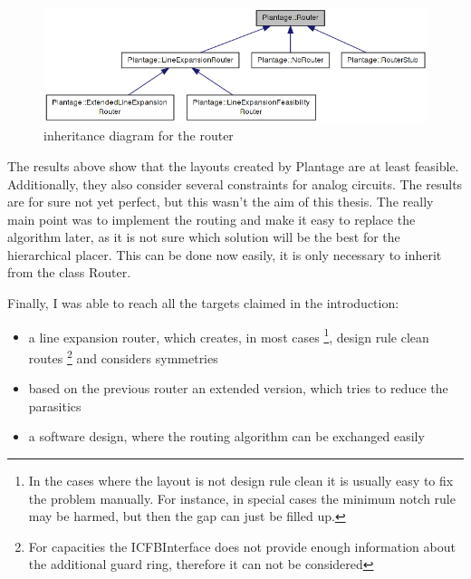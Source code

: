 \begin{figure}
	\centering
	\includegraphics[scale=.6]{FIG/class_diagram_router.png}
  	\caption{inheritance diagram for the router}
	\label{fig:class_diagram_router}
\end{figure}

The results above show that the layouts created by Plantage are at least feasible. Additionally, they also consider several constraints for analog circuits. The results are for sure not yet perfect, but this wasn't the aim of this thesis. The really main point was to implement the routing and make it easy to replace the algorithm later, as it is not sure which solution will be the best for the hierarchical placer. This can be done now easily, it is only necessary to inherit from the class Router.

\begin{samepage}
Finally, I was able to reach all the targets claimed in the introduction:
\begin{itemize}
\item a line expansion router, which creates, in most cases \footnote{In the cases where the layout is not design rule clean it is usually easy to fix the problem manually. For instance, in special cases the minimum notch rule may be harmed, but then the gap can just be filled up.}, design rule clean routes \footnote{For capacities the ICFBInterface does not provide enough information about the additional guard ring, therefore it can not be considered} and considers symmetries
\item based on the previous router an extended version, which tries to reduce the parasitics
\item a software design, where the routing algorithm can be exchanged easily
\end{itemize}
\end{samepage}

